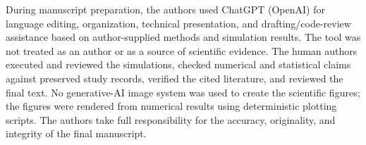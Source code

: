 \documentclass[pdflatex,sn-mathphys-num]{sn-jnl}
\begin{document}
During manuscript preparation, the authors used ChatGPT (OpenAI) for language editing, organization, technical presentation, and drafting/code-review assistance based on author-supplied methods and simulation results. The tool was not treated as an author or as a source of scientific evidence. The human authors executed and reviewed the simulations, checked numerical and statistical claims against preserved study records, verified the cited literature, and reviewed the final text. No generative-AI image system was used to create the scientific figures; the figures were rendered from numerical results using deterministic plotting scripts. The authors take full responsibility for the accuracy, originality, and integrity of the final manuscript.


\end{document}
